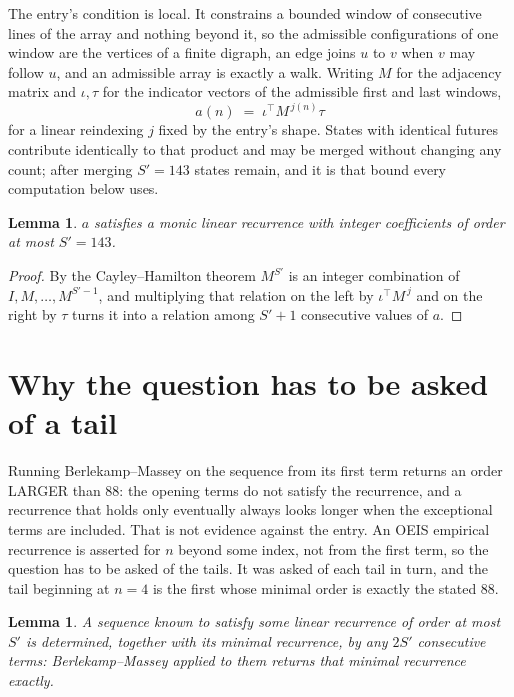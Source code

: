 \documentclass[11pt,a4paper]{article}
\theoremstyle{plain}
\newtheorem{lemma}[theorem]{Lemma}
\theoremstyle{definition}
\begin{document}
The entry's condition is local. It constrains a bounded window of consecutive lines of the
array and nothing beyond it, so the admissible configurations of one window are the vertices of
a finite digraph, an edge joins $u$ to $v$ when $v$ may follow $u$, and an admissible array is
exactly a walk. Writing $M$ for the adjacency matrix and $\iota,\tau$ for the indicator vectors
of the admissible first and last windows,
\[
a(n)\;=\;\iota^{\!\top}M^{\,j(n)}\tau
\]
for a linear reindexing $j$ fixed by the entry's shape. States with identical futures
contribute identically to that product and may be merged without changing any count; after
merging $S'=143$ states remain, and it is that bound every computation below uses.

\begin{lemma}\label{lem:cf}
$a$ satisfies a monic linear recurrence with integer coefficients of order at most $S'=143$.
\end{lemma}

\begin{proof}
By the Cayley--Hamilton theorem $M^{S'}$ is an integer combination of $I,M,\dots,M^{S'-1}$,
and multiplying that relation on the left by $\iota^{\!\top}M^{\,j}$ and on the right by
$\tau$ turns it into a relation among $S'+1$ consecutive values of $a$.
\end{proof}

\section{Why the question has to be asked of a tail}

Running Berlekamp--Massey on the sequence from its first term returns an order LARGER than $88$: the opening terms do not satisfy the recurrence, and a recurrence that holds only eventually always looks longer when the exceptional terms are included. That is not evidence against the entry. An OEIS empirical recurrence is asserted for $n$ beyond some index, not from the first term, so the question has to be asked of the tails. It was asked of each tail in turn, and the tail beginning at $n=4$ is the first whose minimal order is exactly the stated $88$.

\begin{lemma}\label{lem:bm}
A sequence known to satisfy some linear recurrence of order at most $S'$ is determined,
together with its minimal recurrence, by any $2S'$ consecutive terms: Berlekamp--Massey applied
to them returns that minimal recurrence exactly.
\end{lemma}
\end{document}
